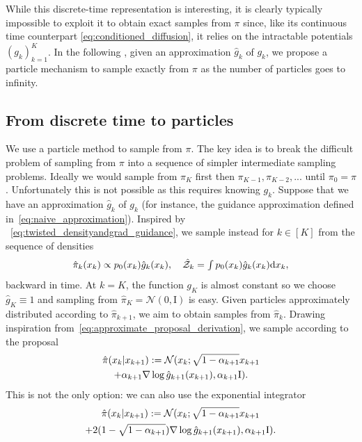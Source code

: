 \documentclass{article}
\theoremstyle{plain}
\theoremstyle{definition}
\theoremstyle{remark}
\begin{document}
While this discrete-time representation is interesting, it is clearly typically impossible to exploit it to obtain exact samples from $\pi$ since, like its continuous time counterpart \eqref{eq:conditioned_diffusion}, it relies on the intractable potentials $(g_k)_{k=1}^K$. In the following , given an approximation $\hat g_k$ of $g_k$, we propose a particle mechanism to sample exactly from $\pi$ as the number of particles goes to infinity.

\subsection{From discrete time to particles}
\label{sec:sampling_via_particles}

We use a particle method to sample from $\pi$. The key idea is to break the difficult problem of sampling from $\pi$ into a sequence of simpler intermediate sampling problems. Ideally we would sample from $\pi_K$ first then $\pi_{K-1}, \pi_{K-2},...$ until $\pi_0=\pi$. Unfortunately this is not possible as this requires knowing $g_k$. Suppose that we have an approximation $\hat g_k$ of $g_k$ (for instance, the guidance approximation defined in~\eqref{eq:naive_approximation}). Inspired by ~\eqref{eq:twisted_densityandgrad_guidance}, we sample instead for $k\in [K]$ from the sequence of densities
\begin{equation}\label{eq:marginalintermediatetarget}
	\textstyle
	\hat \pi_k(x_k)\propto p_0(x_k) \hat g_k(x_k),\quad \hat {\mathcal Z}_k=\int p_0(x_k) \hat g_k(x_k) \mathrm{d} x_k ,
\end{equation}
backward in time. At $k=K$, the function $g_K$ is almost constant so we choose $\hat{g}_K \equiv 1$ and sampling from $\hat \pi_K=\mathcal{N}(0,\mathrm{I})$ is easy.
Given particles approximately distributed according to $\hat\pi_{k+1}$, we aim to obtain samples from $\hat \pi_k$. Drawing inspiration from~\eqref{eq:approximate_proposal_derivation}, we sample according to the proposal
\begin{multline}\label{eq:smc_proposal}
	\hat \pi(x_k|x_{k+1}) := \mathcal N(x_k;\sqrt{1-\alpha_{k+1}} x_{k+1} \\+ \alpha_{k+1} \nabla\log \hat g_{k+1}(x_{k+1}), \alpha_{k+1} \mathrm{I}).
\end{multline}
This is not the only option: we can also use the exponential integrator
\begin{multline*}
	\hat \pi(x_k|x_{k+1}) := \mathcal N(x_k;\sqrt{1-\alpha_{k+1}} x_{k+1} \\+ 2(1 - \sqrt{1-\alpha_{k+1}}) \nabla\log \hat g_{k+1}(x_{k+1}), \alpha_{k+1} \mathrm{I}).
\end{multline*}
\end{document}
